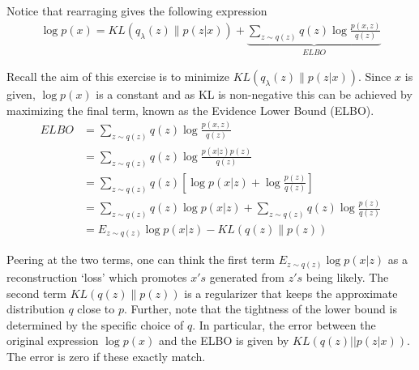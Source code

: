Notice that rearraging gives the following expression
$$
\begin{aligned}
  \log p(x) = KL(q_{\lambda}(z) \| p(z|x)) 
  + \underbrace{\sum_{z \sim q(z)} q(z) \log \frac{p(x,z)}{q(z)}}_{ELBO}
\end{aligned}
$$

Recall the aim of this exercise is to minimize $KL(q_{\lambda}(z) \| p(z|x))$. Since $x$ is given, $\log p(x)$ is a constant and as KL is non-negative this can be achieved by maximizing the final term, known as the Evidence Lower Bound (ELBO).
$$
\begin{aligned}
  ELBO 
  &= \sum_{z \sim q(z)} q(z) \log \frac{p(x,z)}{q(z)} \\
  &= \sum_{z \sim q(z)} q(z) \log \frac{p(x|z)p(z)}{q(z)} \\
  &= \sum_{z \sim q(z)} q(z) \left[ \log p(x|z) 
  + \log \frac{p(z)}{q(z)} \right] \\
  &= \sum_{z \sim q(z)} q(z) \log p(x|z) 
  + \sum_{z \sim q(z)} q(z) \log \frac{p(z)}{q(z)} \\
  &= E_{z \sim q(z)} \log p(x|z) - KL(q(z) \| p(z))
\end{aligned}
$$

Peering at the two terms, one can think the first term $E_{z \sim q(z)} \log p(x|z)$ as a reconstruction `loss' which promotes $x's$ generated from $z's$ being likely. The second term $KL(q(z) \| p(z))$ is a regularizer that keeps the approximate distribution $q$ close to $p$. Further, note that the tightness of the lower bound is determined by the specific choice of $q$. In particular, the error between the original expression $\log p(x)$ and the ELBO is given by $KL(q(z) || p(z|x))$. The error is zero if these exactly match.




